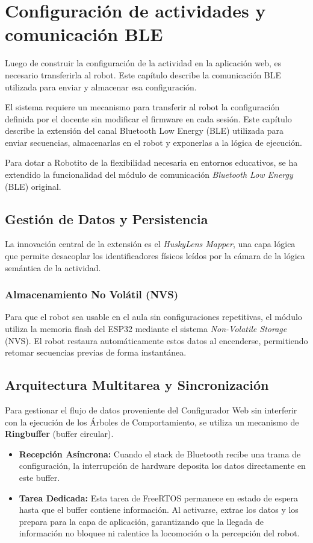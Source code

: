 \documentclass{prgrado}
\begin{document}
\section{Configuración de actividades y comunicación BLE}

Luego de construir la configuración de la actividad en la aplicación web, es necesario transferirla al robot. Este capítulo describe la comunicación BLE utilizada para enviar y almacenar esa configuración.

El sistema requiere un mecanismo para transferir al robot la configuración definida por el docente sin modificar el firmware en cada sesión. Este capítulo describe la extensión del canal Bluetooth Low Energy (BLE) utilizada para enviar secuencias, almacenarlas en el robot y exponerlas a la lógica de ejecución.

Para dotar a Robotito de la flexibilidad necesaria en entornos educativos, se ha extendido la funcionalidad del módulo de comunicación \textit{Bluetooth Low Energy} (BLE) original.

\subsection{Gestión de Datos y Persistencia}
La innovación central de la extensión es el \textit{HuskyLens Mapper}, una capa lógica que permite desacoplar los identificadores físicos leídos por la cámara de la lógica semántica de la actividad.

\subsubsection{Almacenamiento No Volátil (NVS)}
Para que el robot sea usable en el aula sin configuraciones repetitivas, el módulo utiliza la memoria flash del ESP32 mediante el sistema \textit{Non-Volatile Storage} (NVS).
El robot restaura automáticamente estos datos al encenderse, permitiendo retomar secuencias previas de forma instantánea. 

\subsection{Arquitectura Multitarea y Sincronización}

Para gestionar el flujo de datos proveniente del Configurador Web sin interferir con la ejecución de los Árboles de Comportamiento, se utiliza un mecanismo de \textbf{Ringbuffer} (buffer circular).
\begin{itemize}
    \item \textbf{Recepción Asíncrona:} Cuando el stack de Bluetooth recibe una trama de configuración, la interrupción de hardware deposita los datos directamente en este buffer.
    \item \textbf{Tarea Dedicada:} Esta tarea de FreeRTOS permanece en estado de espera hasta que el buffer contiene información. Al activarse, extrae los datos y los prepara para la capa de aplicación, garantizando que la llegada de información no bloquee ni ralentice la locomoción o la percepción del robot.
\end{itemize}
\end{document}
